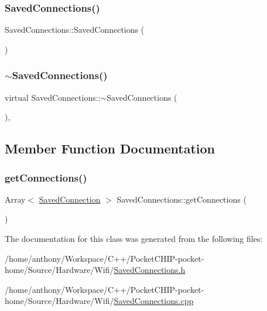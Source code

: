 \subsubsection{\texorpdfstring{Saved\+Connections()}{SavedConnections()}}
{\footnotesize\ttfamily Saved\+Connections\+::\+Saved\+Connections (\begin{DoxyParamCaption}{ }\end{DoxyParamCaption})}

\mbox{\label{classSavedConnections_ad04722b1171afd51c5a375cc5f952317}} 
\subsubsection{\texorpdfstring{$\sim$\+Saved\+Connections()}{~SavedConnections()}}
{\footnotesize\ttfamily virtual Saved\+Connections\+::$\sim$\+Saved\+Connections (\begin{DoxyParamCaption}{ }\end{DoxyParamCaption})\hspace{0.3cm}{\ttfamily [inline]}, {\ttfamily [virtual]}}



\subsection{Member Function Documentation}
\mbox{\label{classSavedConnections_acb9764f074a04de74aaa1ef4bbf379a0}} 
\subsubsection{\texorpdfstring{get\+Connections()}{getConnections()}}
{\footnotesize\ttfamily Array$<$ \mbox{\hyperlink{classSavedConnection}{Saved\+Connection}} $>$ Saved\+Connections\+::get\+Connections (\begin{DoxyParamCaption}{ }\end{DoxyParamCaption})}



The documentation for this class was generated from the following files\+:\begin{DoxyCompactItemize}
\item 
/home/anthony/\+Workspace/\+C++/\+Pocket\+C\+H\+I\+P-\/pocket-\/home/\+Source/\+Hardware/\+Wifi/\mbox{\hyperlink{SavedConnections_8h}{Saved\+Connections.\+h}}\item 
/home/anthony/\+Workspace/\+C++/\+Pocket\+C\+H\+I\+P-\/pocket-\/home/\+Source/\+Hardware/\+Wifi/\mbox{\hyperlink{SavedConnections_8cpp}{Saved\+Connections.\+cpp}}\end{DoxyCompactItemize}

